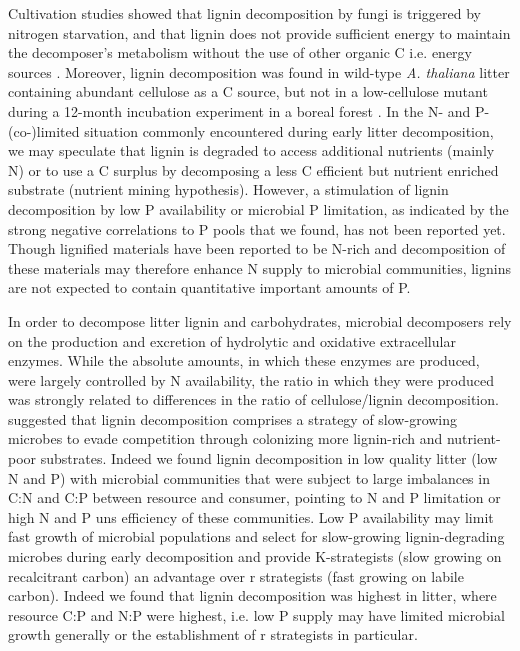 Cultivation studies showed that lignin decomposition by fungi is triggered by nitrogen starvation, and that lignin does not provide sufficient energy to maintain the decomposer's metabolism without the use of other organic C i.e. energy sources \cite{Janshekar1988}. Moreover, lignin decomposition was found in wild-type \emph{A. thaliana} litter containing abundant cellulose as a C source, but not in a low-cellulose mutant during a 12-month incubation experiment in a boreal forest \cite{Talbot2011}. In the N- and P-(co-)limited situation commonly encountered during early litter decomposition, we may speculate that lignin is degraded to access additional nutrients (mainly N) or to use a C surplus by decomposing a less C efficient but nutrient enriched substrate (nutrient mining hypothesis). However, a stimulation of lignin decomposition by low P availability or microbial P limitation, as indicated by the strong negative correlations to P pools that we found, has not been reported yet. Though lignified materials have been reported to be N-rich and decomposition of these materials may therefore enhance N supply to microbial communities, lignins are not expected to contain quantitative important amounts of P.

In order to decompose litter lignin and carbohydrates, microbial decomposers rely on the production and excretion of hydrolytic and oxidative extracellular enzymes. While the absolute amounts, in which these enzymes are produced, were largely controlled by N availability, the ratio in which they were produced was strongly related to differences in the ratio of cellulose/lignin decomposition. \cite{Talbot2011} suggested that lignin decomposition comprises a strategy of slow-growing microbes to evade competition through colonizing more lignin-rich and nutrient-poor substrates. Indeed we found lignin decomposition in low quality litter (low N and P) with microbial communities that were subject to large imbalances in C:N and C:P between resource and consumer, pointing to N and P limitation or high N and P uns efficiency of these communities. Low P availability may limit fast growth of microbial populations and select for slow-growing lignin-degrading microbes during early decomposition and provide K-strategists (slow growing on recalcitrant carbon) an advantage over r strategists (fast growing on labile carbon). Indeed we found that lignin decomposition was highest in litter, where resource C:P and N:P were highest, i.e. low P supply may have limited microbial growth generally or the establishment of r strategists in particular.

